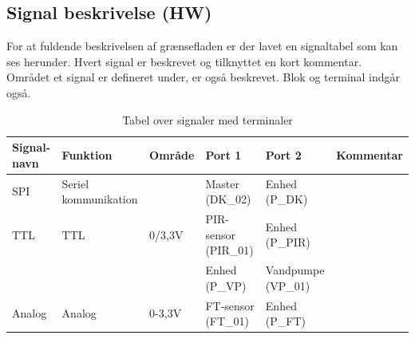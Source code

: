 \begin{table}[H]
\subsection{Signal beskrivelse (HW)}
For at fuldende beskrivelsen af grænsefladen er der lavet en signaltabel som kan ses herunder. Hvert signal er beskrevet og tilknyttet en kort kommentar. Området et signal er defineret under, er også beskrevet. Blok og terminal indgår også. 
\caption{Tabel over signaler med terminaler}
\begin{small}
\begin{tabular}{|p{2cm}|p{2cm}|p{2cm}|p{2cm}|p{2cm}|p{}|}
\hline

\textbf{Signal-navn}	&\textbf{Funktion} 		&\textbf{Område} &\textbf{Port 1} 	&\textbf{Port 2} 			&\textbf{Kommentar} \\ \hline

SPI 					&Seriel kommunikation 	& 				&Master (DK\_02)		&Enhed (P\_DK)				&					 \\\hline

TTL 					&TTL 					&0\slash3,3V 	&PIR-sensor (PIR\_01) &Enhed (P\_PIR)			&					\\\cline{4-5}
					&						&				&Enhed (P\_VP)		&Vandpumpe (VP\_01)			&					\\\hline
					
Analog				&Analog 					&0-3,3V 			&FT-sensor (FT\_01) &Enhed (P\_FT)				&	    				\\\hline

\end{tabular}
\end{small}
\label{table:Signaltabel}
\end{table}


